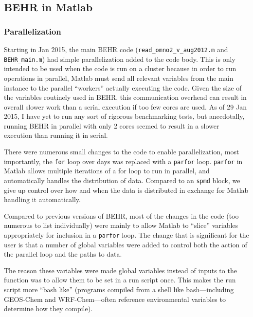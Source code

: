 \documentclass[12pt]{article}
\begin{document}
	\subsection{BEHR in Matlab}
	\subsubsection{Parallelization}
		Starting in Jan 2015, the main BEHR code (\lstinline[breaklines=true]|read_omno2_v_aug2012.m| and \lstinline[breaklines=true]|BEHR_main.m|) had simple parallelization added to the code body.  This is only intended to be used when the code is run on a cluster because in order to run operations in parallel, Matlab must send all relevant variables from the main instance to the parallel ``workers'' actually executing the code.  Given the size of the variables routinely used in BEHR, this communication overhead can result in overall slower work than a serial execution if too few cores are used.  As of 29 Jan 2015, I have yet to run any sort of rigorous benchmarking tests, but anecdotally, running BEHR in parallel with only 2 cores seemed to result in a slower execution than running it in serial.
		
		There were numerous small changes to the code to enable parallelization, most importantly, the \lstinline[breaklines=true]|for| loop over days was replaced with a \lstinline[breaklines=true]|parfor| loop. \lstinline[breaklines=true]|parfor| in Matlab allows multiple iterations of a for loop to run in parallel, and automatically handles the distribution of data.  Compared to an \lstinline[breaklines=true]|spmd| block, we give up control over how and when the data is distributed in exchange for Matlab handling it automatically.
		
		Compared to previous versions of BEHR, most of the changes in the code (too numerous to list individually) were mainly to allow Matlab to ``slice'' variables appropriately for inclusion in a \lstinline[breaklines=true]|parfor| loop.  The change that is significant for the user is that a number of global variables were added to control both the action of the parallel loop and the paths to data.  

		The reason these variables were made global variables instead of inputs to the function was to allow them to be set in a run script once. This makes the run script more ``bash like'' (programs compiled from a shell like bash---including GEOS-Chem and WRF-Chem---often reference environmental variables to determine how they compile).  
		
\end{document}
